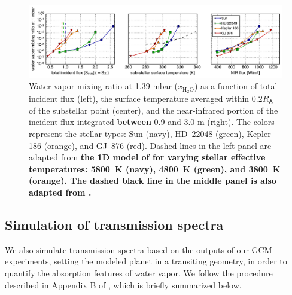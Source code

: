 \documentclass[11pt,numberedappendix,twocolappendix,]{emulateapj}
\def\water{H$_2$O}
\def\xwater{$x_\text{\water}$}
\def\preslevel{1.39 mbar}
\def\wv{water vapor}
\def\revise#1{{\bf #1}}
\begin{document}
\begin{figure}[t]
    \begin{center}
    \includegraphics[width=\hsize]{xH2O_3panels_ver2.pdf}
    \end{center}
\caption{Water vapor mixing ratio at \preslevel{} (\xwater{}) as a function of total incident flux (left), the surface temperature averaged within $0.2R_\earth$ of the substellar point (center), and the near-infrared portion of the incident flux integrated \revise{between} 0.9 and 3.0 \textmu m (right). The colors represent the stellar types: Sun (navy), HD~22048 (green), Kepler-186 (orange), and GJ~876 (red). Dashed lines in the left panel are adapted from \revise{the 1D model of \citet{Kopparapu2013} for varying stellar effective temperatures: 5800~K (navy), 4800~K (green), and 3800~K (orange). The dashed black line in the middle panel is also adapted from \citet{Kopparapu2013}. }}           
\label{fig:xH2O_S0X}
\end{figure}

\subsection{Simulation of transmission spectra}
\label{ss:method_TransmissionSpectra}

We also simulate transmission spectra based on the outputs of our GCM experiments, setting the modeled planet in a transiting geometry, in order to quantify the absorption features of \wv{}.  
We follow the procedure described in Appendix B of \citet{Way2017}, which is briefly summarized below. 
\end{document}
